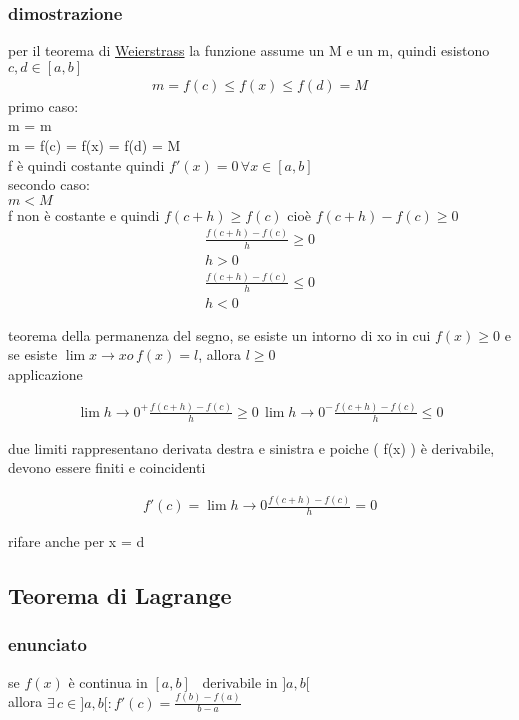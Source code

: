 \documentclass[a4paper,11pt]{article}
\begin{document}
\subsubsection{dimostrazione}
per il teorema di \hyperref[sec:Weierstrass]{Weierstrass} la funzione assume un M e un m, quindi esistono \( c,d \in [a,b]\)
\begin{align*}
    m = f(c) \leq f(x) \leq f(d) = M 
\end{align*}
primo caso:
\\
m = m
\\
m = f(c) = f(x) = f(d) = M 
\\
f è quindi costante quindi \( f'(x) = 0 \, \forall x \in [a,b]\)
\\ 
secondo caso:
\\
\( m < M \)
\\
f non è costante e quindi \( f(c+h) \geq f(c) \) cioè \( f(c+h) - f(c) \geq 0 \) 
\begin{align*}
    \frac{f(c+h) - f(c)}{h} \geq 0 
    \\
    h > 0
    \\
    \frac{f(c+h) - f(c)}{h} \leq 0 
    \\
    h < 0
\end{align*}

teorema della permanenza del segno, se esiste un intorno di xo in cui \(f(x) \geq 0 \) e se esiste \( \lim{x \to xo} \, f(x) = l \), allora \( l \geq 0 \)
\\
applicazione

\begin{align*}
  \lim{h \to 0^+} \frac{f(c+h)-f(c)}{h} \geq 0  \, \lim{h \to 0^- } \frac{f(c+h)-f(c)}{h} \leq 0
\end{align*}

due limiti rappresentano derivata destra e sinistra e poiche ( f(x) ) è derivabile, devono essere finiti e coincidenti

\begin{align*}
    f'(c) = \lim{h \to 0} \frac{f(c+h)-f(c)}{h} = 0
\end{align*}

rifare anche per x = d

\subsection{Teorema di Lagrange}
\subsubsection{enunciato}
se \(f(x)\) è continua in \([a,b]\) \, derivabile in \(]a,b[\) 
\\
allora \( \exists \, c \in ]a,b[ : f' (c) = \frac{f(b)-f(a)}{b-a}  \)
\end{document}
